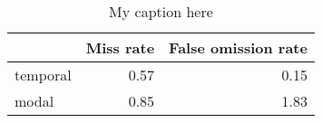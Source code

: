 \begin{table}[!ht]
\centering
\begin{tabular}{lrr}
\toprule
{} &  Miss rate &  False omission rate \\
\midrule
temporal &       0.57 &                 0.15 \\
modal    &       0.85 &                 1.83 \\
\bottomrule
\end{tabular}
\caption{My caption here}
\label{tab:DEICTICITY-ocd-combined-errors}
\end{table}